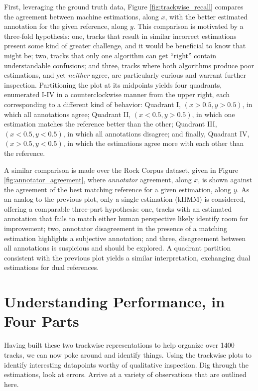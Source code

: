 \documentclass{article}
\begin{document}
First, leveraging the ground truth data, Figure \ref{fig:trackwise_recall} compares the agreement between machine estimations, along $x$, with the better estimated annotation for the given reference, along $y$.
This comparison is motivated by a three-fold hypothesis:
one, tracks that result in similar incorrect estimations present some kind of greater challenge, and it would be beneficial to know that might be;
two, tracks that only one algorithm can get ``right'' contain understandable confusions;
and three, tracks where both algorithms produce poor estimations, and yet \emph{neither} agree, are particularly curious and warrant further inspection.
Partitioning the plot at its midpoints yields four quadrants, enumerated I-IV in a counterclockwise manner from the upper right, each corresponding to a different kind of behavior:
Quadrant I, $(x > 0.5, y > 0.5)$, in which all annotations agree;
Quadrant II, $(x < 0.5, y > 0.5)$, in which one estimation matches the reference better than the other;
Quadrant III, $(x < 0.5, y < 0.5)$, in which all annotations disagree;
and finally, Quadrant IV, $(x > 0.5, y < 0.5)$, in which the estimations agree more with each other than the reference.


A similar comparison is made over the Rock Corpus dataset, given in Figure \ref{fig:annotator_agreement}, where \emph{annotator} agreement, along $x$, is shown against the agreement of the best matching reference for a given estimation, along $y$.
As an analog to the previous plot, only a single estimation (kHMM) is considered, offering a comparable three-part hypothesis:
one, tracks with an estimated annotation that fails to match either human perspective likely identify room for improvement;
two, annotator disagreement in the presence of a matching estimation highlights a subjective annotation;
and three, disagreement between all annotations is suspicious and should be explored.
A quadrant partition consistent with the previous plot yields a similar interpretation, exchanging dual estimations for dual references.


\section{Understanding Performance, in Four Parts}
\label{sec:data_analysis}

Having built these two trackwise representations to help organize over 1400 tracks, we can now poke around and identify things.
Using the trackwise plots to identify interesting datapoints worthy of qualitative inspection.
Dig through the estimations, look at errors.
Arrive at a variety of observations that are outlined here.
\end{document}
